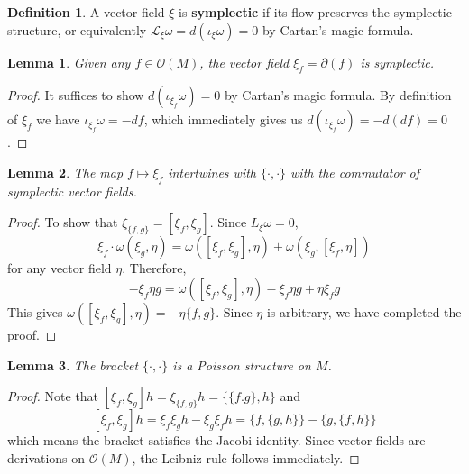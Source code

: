 \documentclass[12pt]{report}
\newtheorem{lemma}{Lemma}[section]
\theoremstyle{remark}
\theoremstyle{definition}
\newtheorem{definition}{Definition}[section]
\newcommand{\w}[0]{\omega}
\begin{document}
    \begin{definition}
        A vector field $\xi$ is \textbf{symplectic} if its flow preserves the symplectic structure, or equivalently $\mathcal L_\xi \w=d(\iota_\xi\w)=0$ by Cartan's magic formula.
    \end{definition}
    \begin{lemma}
        Given any $f\in\mathcal O(M)$, the vector field $\xi_f=\partial(f)$ is symplectic.
    \end{lemma}
    \begin{proof}
        It suffices to show $d(\iota_{\xi_f}\w)=0$ by Cartan's magic formula. By definition of $\xi_f$ we have $\iota_{\xi_f}\w=-df$, which immediately gives us $d(\iota_{\xi_f}\w)=-d(df)=0$.
    \end{proof}
    \begin{lemma}
        The map $f\mapsto\xi_f$ intertwines with $\{\cdot, \cdot\}$ with the commutator of symplectic vector fields. 
    \end{lemma}
    \begin{proof}
        To show that $\xi_{\{f,g\}}=[\xi_f,\xi_g]$. Since $L_\xi\w=0$, 
        \[\xi_f\cdot\w(\xi_g,\eta)=\w([\xi_f,\xi_g],\eta)+\w(\xi_g,[\xi_f,\eta])\]
        for any vector field $\eta$. Therefore,
        \[-\xi_f\eta g=\w([\xi_f,\xi_g],\eta)-\xi_f\eta g+\eta\xi_f g\]
        This gives $\w([\xi_f,\xi_g],\eta)=-\eta\{f, g\}$. Since $\eta$ is arbitrary, we have completed the proof.
    \end{proof}
    \begin{lemma}
        The bracket $\{\cdot, \cdot\}$ is a Poisson structure on $M$.
    \end{lemma}
    \begin{proof}
        Note that $[\xi_f,\xi_g]h=\xi_{\{f, g\}}h=\{\{f. g\}, h\}$ and
        \[[\xi_f,\xi_g]h=\xi_f\xi_gh-\xi_g\xi_fh=\{f,\{g,h\}\}-\{g,\{f,h\}\}\]
        which means the bracket satisfies the Jacobi identity. Since vector fields are derivations on $\mathcal O(M)$, the Leibniz rule follows immediately.
    \end{proof}
\end{document}
